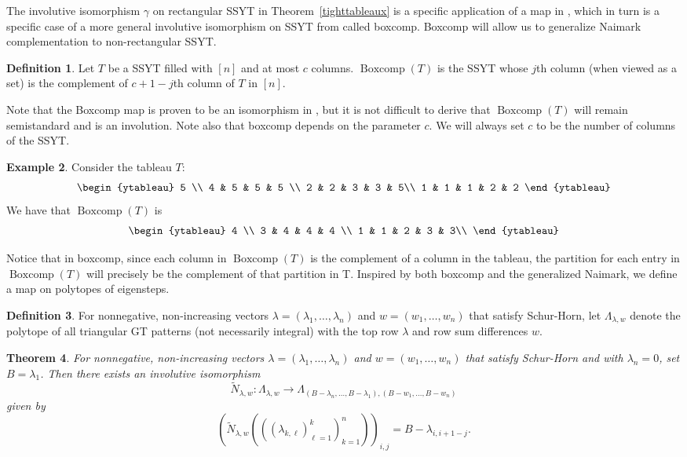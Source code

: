 \documentclass[10pt]{article}
\theoremstyle{plain}
\newtheorem{thm}{Theorem}[section]
\theoremstyle{definition}
\newtheorem{definition}[thm]{Definition}
\newtheorem{example}[thm]{Example}
\newcommand{\bc}{\operatorname{Boxcomp}}
\begin{document}
The involutive isomorphism $\gamma$ on rectangular SSYT in Theorem~\ref{tighttableaux} is a specific application of a map in \cite{GRgeneralized}, which in turn is a specific case of a more general involutive isomorphism on SSYT from \cite{RSpercent} called boxcomp.  Boxcomp will allow us to generalize Naimark complementation to non-rectangular SSYT.

\begin{definition}\label{boxcomp}
Let $T$ be a SSYT filled with $[n]$ and at most $c$ columns. $\bc(T)$ is the SSYT whose $j$th column (when viewed as a set) is the complement of $c+1-j$th column of $T$ in $[n]$. 
\end{definition}

Note that the Boxcomp map is proven to be an isomorphism in \cite{RSpercent}, but it is not difficult to derive that $\bc(T)$ will remain semistandard and is an involution.  Note also that boxcomp depends on the parameter $c$.  We will always set $c$ to be the number of columns of the SSYT.

\begin{example}
Consider the tableau $T$:
\[
\begin{ytableau}
5 \\
4 & 5 & 5 & 5 \\
2 & 2 & 3 & 3 & 5\\
1 & 1 & 1 & 2 & 2 
\end{ytableau}
\]
We have that $\bc(T)$ is 
\[
\begin{ytableau}
4 \\
3 & 4 & 4 & 4 \\
1 & 1 & 2 & 3 & 3\\
\end{ytableau}
\]
\end{example}

Notice that in boxcomp, since each column in $\bc(T)$ is the complement of a column in the tableau, the partition for each entry in $\bc(T)$ will precisely be the complement of that partition in T. Inspired by both boxcomp and the generalized Naimark, we define a map on polytopes of eigensteps.

\begin{definition}
    For nonnegative, non-increasing vectors $\lambda=(\lambda_1, \hdots, \lambda_n)$ and  $w =(w_1,\hdots, w_n)$ that satisfy Schur-Horn, let $\Lambda_{\lambda,w}$ denote the polytope of all triangular GT patterns (not necessarily integral) with the top row $\lambda$ and row sum differences $w$.
\end{definition}
\begin{thm}\label{generalGTcomp}
For nonnegative, non-increasing vectors $\lambda=(\lambda_1, \hdots, \lambda_n)$ and $w =(w_1,\hdots, w_n)$ that satisfy Schur-Horn and with $\lambda_n=0$, set $B=\lambda_1$.  Then there exists an involutive isomorphism
\[
\tilde{N}_{\lambda,w}: \Lambda_{\lambda,w} \longrightarrow \Lambda_{(B-\lambda_n, \hdots, B-\lambda_1),(B-w_1, \hdots, B-w_n)}
\]
given by
\[
\left(\tilde{N}_{\lambda,w}\left( ((\lambda_{k,\ell})_{\ell=1}^k)_{k=1}^n\right)\right)_{i,j} = 
B - \lambda_{i, i+1-j}.
\]
\end{thm} 
\end{document}
